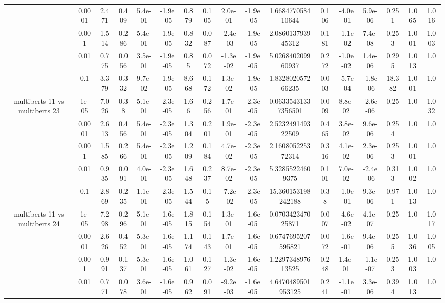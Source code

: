 \begin{tabular}{|c|c|c|c|c|c|c|c|c|c|c|c|c|c|c|c|c|}
 & 0.0001 & 2.471 & 0.409 & 5.4e-01 & -1.9e-05 & 0.879 & 0.105 & 2.0e-01 & -1.9e-05 & 1.668477058410644 & 0.106 & -4.0e-01 & 5.9e-06 & 0.251 & 1.065 & 1.016 \\
 & 0.001 & 1.514 & 0.286 & 5.4e-01 & -1.9e-05 & 0.832 & 0.087 & -2.4e-03 & -1.9e-05 & 2.086013793945312 & 0.181 & -1.1e-02 & 7.4e-08 & 0.253 & 1.001 & 1.003 \\
 & 0.01 & 0.775 & 0.056 & 3.5e-01 & -1.9e-05 & 0.85 & 0.072 & -1.3e-02 & -1.9e-05 & 5.026840209960937 & 0.272 & -1.0e-02 & 1.4e-06 & 0.295 & 1.013 & 1.0 \\
 & 0.1 & 3.379 & 0.332 & 9.7e-02 & -1.9e-05 & 8.668 & 0.172 & 1.3e-02 & -1.9e-05 & 1.832802057266235 & 0.003 & -5.7e-04 & -1.8e-06 & 18.382 & 1.001 & 1.0 \\
\hline
\multirow{5}{*}{multiberts 11 vs multiberts 23} & 1e-05 & 7.026 & 0.38 & 5.1e-01 & -2.3e-05 & 1.66 & 0.256 & 1.7e-01 & -2.3e-05 & 0.06335431337356501 & 0.009 & 8.8e-02 & -2.6e-06 & 0.25 & 1.0 & 1.032 \\
 & 0.0001 & 2.613 & 0.456 & 5.4e-01 & -2.3e-05 & 1.304 & 0.201 & 1.9e-01 & -2.3e-05 & 2.523249149322509 & 0.465 & 3.8e-02 & 9.6e-06 & 0.254 & 1.0 & 1.0 \\
 & 0.001 & 1.585 & 0.266 & 5.4e-01 & -2.3e-05 & 1.209 & 0.184 & 4.7e-02 & -2.3e-05 & 2.160805225372314 & 0.316 & 4.1e-02 & 2.3e-06 & 0.253 & 1.001 & 1.0 \\
 & 0.01 & 0.935 & 0.091 & 4.0e-01 & -2.3e-05 & 1.648 & 0.237 & 8.7e-02 & -2.3e-05 & 5.32855224609375 & 0.101 & 7.0e-02 & -2.4e-06 & 0.313 & 1.002 & 1.0 \\
 & 0.1 & 2.869 & 0.235 & 1.1e-01 & -2.3e-05 & 1.544 & 0.15 & -7.2e-02 & -2.3e-05 & 15.360153198242188 & 0.38 & -1.0e-01 & 9.3e-06 & 0.971 & 1.013 & 1.0 \\
\hline
\multirow{5}{*}{multiberts 11 vs multiberts 24} & 1e-05 & 7.298 & 0.296 & 5.1e-01 & -1.6e-05 & 1.815 & 0.154 & 1.3e-01 & -1.6e-05 & 0.070342347025871 & 0.007 & -4.6e-02 & 4.1e-07 & 0.25 & 1.0 & 1.017 \\
 & 0.0001 & 2.626 & 0.452 & 5.3e-01 & -1.6e-05 & 1.174 & 0.143 & 1.7e-01 & -1.6e-05 & 0.6747695207595821 & 0.072 & -1.6e-01 & 9.4e-06 & 0.255 & 1.036 & 1.005 \\
 & 0.001 & 0.991 & 0.137 & 5.3e-01 & -1.6e-05 & 1.061 & 0.127 & -1.3e-02 & -1.6e-05 & 1.229734897613525 & 0.248 & 1.4e-01 & -1.1e-07 & 0.253 & 1.003 & 1.0 \\
 & 0.01 & 0.771 & 0.078 & 3.6e-01 & -1.6e-05 & 0.962 & 0.091 & -9.2e-03 & -1.6e-05 & 4.6470489501953125 & 0.241 & -1.1e-01 & 3.3e-06 & 0.394 & 1.013 & 1.0 \\

\end{tabular}

